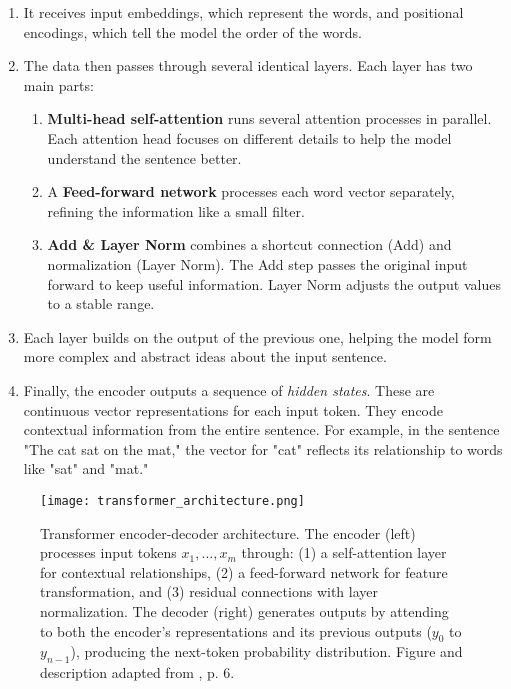     \begin{enumerate}
        \item It receives input embeddings, which represent the words, and positional encodings, which tell the model the order of the words.
        
        \item The data then passes through several identical layers. Each layer has two main parts:
        \begin{enumerate}[label=\alph*.]
            \item \textbf{Multi-head self-attention} runs several attention processes in parallel. Each attention head focuses on different details to help the model understand the sentence better.
            \item A \textbf{Feed-forward network} processes each word vector separately, refining the information like a small filter.
            \item \textbf{Add \& Layer Norm} combines a shortcut connection (Add) and normalization (Layer Norm). The Add step passes the original input forward to keep useful information. Layer Norm adjusts the output values to a stable range.
    \end{enumerate}
    
    \item Each layer builds on the output of the previous one, helping the model form more complex and abstract ideas about the input sentence.
    
    \item Finally, the encoder outputs a sequence of \textit{hidden states}. These are continuous vector representations for each input token. They encode contextual information from the entire sentence. For example, in the sentence "The cat sat on the mat," the vector for "cat" reflects its relationship to words like "sat" and "mat."
\end{enumerate}

\begin{figure}[ht]
    \centering
	\texttt{[image: transformer\_architecture.png]}	
    \caption{Transformer encoder-decoder architecture. The encoder (left) processes input tokens \(x_1,\dots,x_m\) through: (1) a self-attention layer for contextual relationships, (2) a feed-forward network for feature transformation, and (3) residual connections with layer normalization. The decoder (right) generates outputs by attending to both the encoder's representations and its previous outputs ($y_0$ to $y_{n-1}$), producing the next-token probability distribution. Figure and description adapted from \textcite{xiaoIntroductionTransformersNLP2023}, p. 6.}
    \label{fig:transformer_architecture}
\end{figure}

